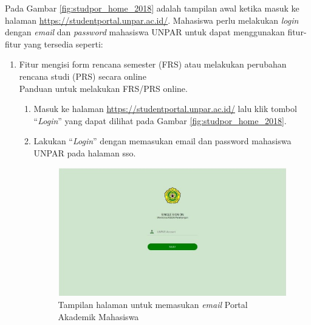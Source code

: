 Pada Gambar \ref{fig:studpor_home_2018} adalah tampilan awal ketika masuk ke halaman \url{https://studentportal.unpar.ac.id/}. Mahasiswa perlu melakukan \textit{login} dengan \textit{email} dan \textit{password} mahasiswa UNPAR untuk dapat menggunakan fitur-fitur yang tersedia seperti:
\begin{enumerate}
	\item Fitur mengisi form rencana semester (FRS) atau melakukan perubahan rencana studi (PRS) secara online \\
	Panduan untuk melakukan FRS/PRS online.
	\begin{enumerate}
		\item Masuk ke halaman \url{https://studentportal.unpar.ac.id/} lalu klik tombol ``\textit{Login}'' yang dapat dilihat pada Gambar \ref{fig:studpor_home_2018}.
		\item Lakukan ``\textit{Login}'' dengan memasukan email dan password mahasiswa UNPAR pada halaman sso.
		\begin{figure}[H]
			\centering
			\includegraphics[scale=0.7]{Gambar/sso2018.jpg}
			\caption{Tampilan halaman untuk memasukan \textit{email} Portal Akademik Mahasiswa} 
			\label{fig:sso_2018}
		\end{figure}
	

\end{enumerate}
\end{enumerate}
